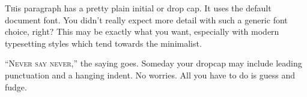 \documentclass{article}
\begin{document}
\lettrine{T}his paragraph has a pretty plain initial or drop cap.
It uses the default document font.
You didn’t really expect more detail with such a generic font choice, right?
This may be exactly what you want, especially with modern typesetting styles which tend towards the minimalist.

\lettrine[lhang=.4]{“N}{ever say never,}” the saying goes.
Someday your dropcap may include leading punctuation {and} a hanging indent.
No worries.
All you have to do is guess and fudge.
\end{document}
